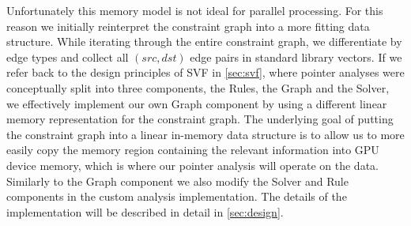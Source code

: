 Unfortunately this memory model is not ideal for parallel processing.
For this reason we initially reinterpret the constraint graph into a more fitting data structure.
While iterating through the entire constraint graph, we differentiate by edge types and collect all $(src,dst)$ edge pairs in standard library vectors.
If we refer back to the design principles of SVF in \autoref{sec:svf}, where pointer analyses were conceptually split into three components, the Rules, the Graph and the Solver, we effectively implement our own Graph component by using a different linear memory representation for the constraint graph. 
The underlying goal of putting the constraint graph into a linear in-memory data structure is to allow us to more easily copy the memory region containing the relevant information into GPU device memory, which is where our pointer analysis will operate on the data.
Similarly to the Graph component we also modify the Solver and Rule components in the custom analysis implementation.
The details of the implementation will be described in detail in \autoref{sec:design}.

